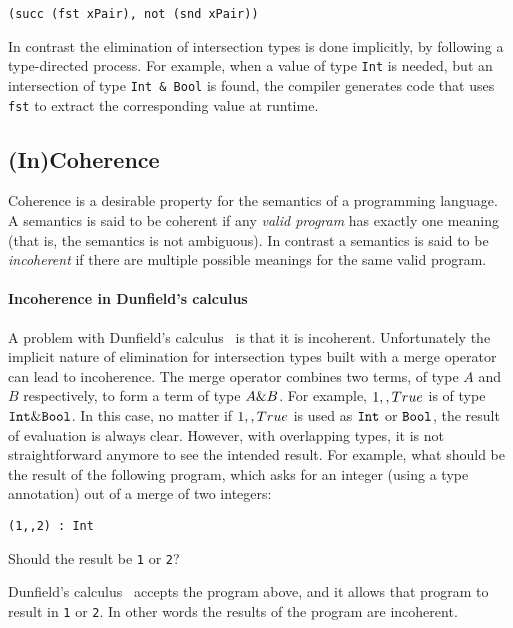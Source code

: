 \begin{lstlisting}
(succ (fst xPair), not (snd xPair))
\end{lstlisting}

\noindent In contrast the elimination of intersection types is done
implicitly, by following a type-directed process. For example,
when a value of type \lstinline{Int} is needed, but an intersection
of type \lstinline{Int & Bool} is found, the compiler generates code 
that uses \lstinline{fst} to extract the corresponding value at runtime.

\subsection{(In)Coherence} \label{subsec:incoherence}

Coherence is a desirable property for the semantics of a programming
language. A semantics is said to be coherent if any \emph{valid
  program} has exactly one meaning~\cite{reynolds1991coherence} (that
is, the semantics is not ambiguous). In contrast a semantics is said
to be \emph{incoherent} if there are multiple possible meanings for
the same valid program. 

\paragraph{Incoherence in Dunfield's calculus}
A problem with Dunfield's calculus~\cite{dunfield2014elaborating} is
that it is incoherent.  Unfortunately the implicit nature of
elimination for intersection types built with a merge operator can
lead to incoherence.  The merge operator combines two terms, of type
$A$ and $B$ respectively, to form a term of type $A \& B$. For
example, $1 ,, True$ is of type $\texttt{Int} \&
\texttt{Bool}$. In this case, no matter if $1 ,, True$ is used as
$\texttt{Int}$ or $\texttt{Bool}$, the result of evaluation is always
clear. However, with overlapping types, it is not straightforward
anymore to see the intended result. For example, what should be the result of
the following program, which asks for an integer (using a type annotation) out
of a merge of two integers:
\begin{lstlisting}
(1,,2) : Int
\end{lstlisting}
Should the result be \lstinline$1$ or \lstinline$2$?

Dunfield's calculus~\cite{dunfield2014elaborating} accepts the program
above, and it allows that program to result in \lstinline$1$ or \lstinline$2$.
In other words the results of the program are incoherent.

